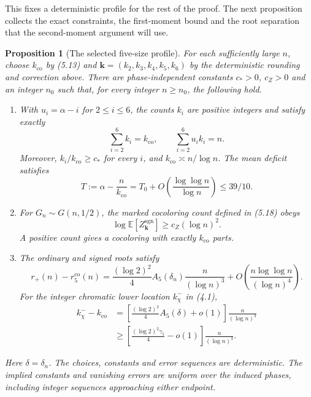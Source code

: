 \documentclass[a4paper,10pt,reqno]{amsart}
\numberwithin{equation}{section}
\newcommand{\Exp}[1]{\mathbb{E}\!\left[#1\right]}
\theoremstyle{plain}
\newtheorem{proposition}[theorem]{Proposition}
\theoremstyle{remark}
\begin{document}
This fixes a deterministic profile for the rest of the proof. The next
proposition collects the exact constraints, the first-moment bound and the
root separation that the second-moment argument will use.

\begin{proposition}[The selected five-size profile]
\label{prop:selected-profile-contract}
For each sufficiently large $n$, choose $k_{\mathrm{co}}$ by (5.13) and
$\mathbf k=(k_2,k_3,k_4,k_5,k_6)$ by the deterministic rounding and correction
above. There are phase-independent constants $c_*>0$, $c_Z>0$ and an
integer $n_0$ such that, for every integer $n\ge n_0$, the following hold.
\begin{enumerate}[label=\textup{(\roman*)}]
\item With $u_i=\alpha-i$ for $2\le i\le6$, the counts $k_i$ are positive
integers and satisfy exactly
\[
  \sum_{i=2}^6 k_i=k_{\mathrm{co}},
  \qquad
  \sum_{i=2}^6u_i k_i=n.
\]
Moreover, $k_i/k_{\mathrm{co}}\ge c_*$ for every $i$, and
$k_{\mathrm{co}}\asymp n/\log n$. The mean deficit satisfies
\[
 T:=\alpha-\frac{n}{k_{\mathrm{co}}}
 =T_0+O\!\left(\frac{\log\log n}{\log n}\right)\le39/10.
\]
\item For $G_n\sim G(n,1/2)$, the marked cocoloring count defined in (5.18)
obeys
\[
  \log\Exp{Z_{\mathbf k}^{\mathrm{sgn}}}\ge c_Z(\log n)^2.
\]
A positive count gives a cocoloring with exactly
$k_{\mathrm{co}}$ parts.
\item The ordinary and signed roots satisfy
\[
 r_+(n)-r_5^{\mathrm{co}}(n)
 =\frac{(\log 2)^2}{4}A_5(\delta_n)\frac n{(\log n)^3}
   +O\!\left(\frac{n\log\log n}{(\log n)^4}\right).
\]
For the integer chromatic lower location $k_\chi^-$ in (4.1),
\[
\begin{aligned}
 k_\chi^- -k_{\mathrm{co}}
 &=\left[\frac{(\log 2)^2}{4}A_5(\delta)+o(1)\right]
       \frac n{(\log n)^3}\\
 &\ge\left[\frac{(\log 2)^2\gamma_5}{4}-o(1)\right]
       \frac n{(\log n)^3}.
\end{aligned}                                                   \tag{5.20}
\]
\end{enumerate}
Here $\delta=\delta_n$. The choices, constants and error sequences are
deterministic. The implied constants and vanishing errors are uniform over
the induced phases, including integer sequences approaching either endpoint.
\end{proposition}
\end{document}
